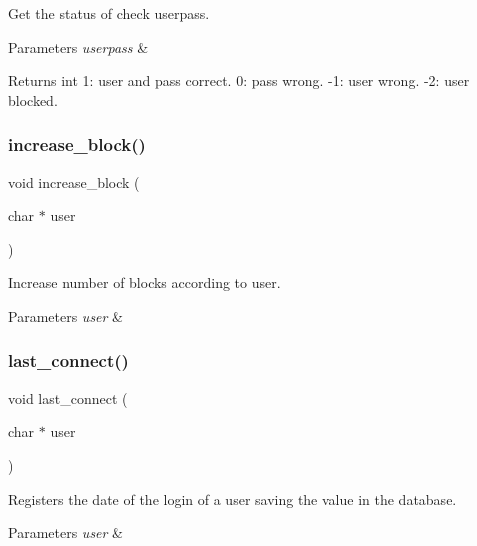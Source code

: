 Get the status of check userpass. 


\begin{DoxyParams}{Parameters}
{\em userpass} & \\
\hline
\end{DoxyParams}
\begin{DoxyReturn}{Returns}
int 1\+: user and pass correct. 0\+: pass wrong. -\/1\+: user wrong. -\/2\+: user blocked. 
\end{DoxyReturn}
\mbox{\label{auth_8c_a5477481a6cf3be8d1fea01a8d35ceff2}} 
\subsubsection{increase\+\_\+block()}
{\footnotesize\ttfamily void increase\+\_\+block (\begin{DoxyParamCaption}\item[{char $\ast$}]{user }\end{DoxyParamCaption})}



Increase number of blocks according to user. 


\begin{DoxyParams}{Parameters}
{\em user} & \\
\hline
\end{DoxyParams}
\mbox{\label{auth_8c_adedb2d3fe2edbbc0dc8873423f20a23b}} 
\subsubsection{last\+\_\+connect()}
{\footnotesize\ttfamily void last\+\_\+connect (\begin{DoxyParamCaption}\item[{char $\ast$}]{user }\end{DoxyParamCaption})}



Registers the date of the login of a user saving the value in the database. 


\begin{DoxyParams}{Parameters}
{\em user} & \\
\hline
\end{DoxyParams}
\mbox{\label{auth_8c_a057d702fc9dbc94e59ee567c7d9f0a6e}} 
